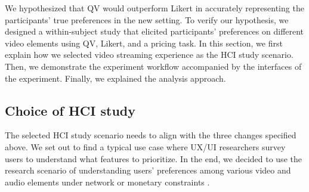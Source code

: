 We hypothesized that QV would outperform Likert in accurately representing the participants' true preferences in the new setting. To verify our hypothesis, we designed a within-subject study that elicited participants' preferences on different video elements using QV, Likert, and a pricing task. In this section, we first explain how we selected video streaming experience as the HCI study scenario. Then, we demonstrate the experiment workflow accompanied by the interfaces of the experiment. Finally, we explained the analysis approach.

 
\subsection{Choice of HCI study}
The selected HCI study scenario needs to align with the three changes specified above. We set out to find a typical use case where UX/UI researchers survey users to understand what features to prioritize. In the end, we decided to use the research scenario of understanding users' preferences among various video and audio elements under network or monetary constraints \cite{molnar2013comedy, oeldorf2012bad}.

